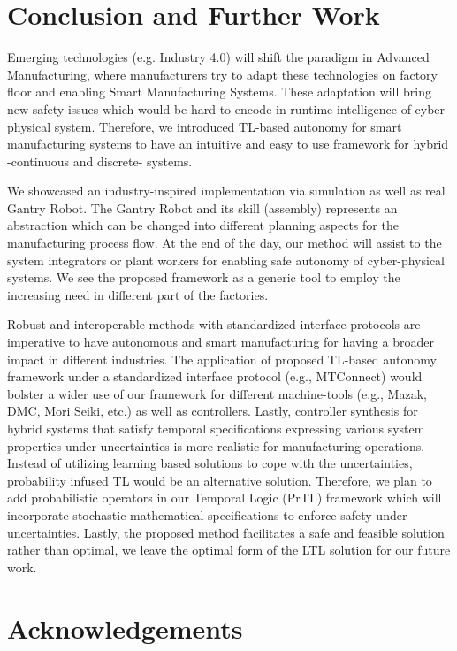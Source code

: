 \documentclass[3p,twocolumn,times,procedia]{elsarticle}
\begin{document}
\section{Conclusion and Further Work}
Emerging technologies (e.g. Industry 4.0) will shift the paradigm in Advanced Manufacturing, where manufacturers try to adapt these technologies on factory floor and enabling Smart Manufacturing Systems. These adaptation will bring new safety issues which would be hard to encode in runtime intelligence of cyber-physical system. Therefore, we introduced TL-based autonomy for smart manufacturing systems to have an intuitive and easy to use framework for hybrid -continuous and discrete- systems.

We showcased an industry-inspired implementation via simulation as well as real Gantry Robot. The Gantry Robot and its skill (assembly) represents an abstraction which can be changed into different planning aspects for the manufacturing process flow. At the end of the day, our method will assist to the system integrators or plant workers for enabling safe autonomy of cyber-physical systems. We see the proposed framework as a generic tool to employ the increasing need in different part of the factories.

Robust and interoperable methods with standardized interface protocols are imperative to have autonomous and smart manufacturing for having a broader impact in different industries. The application of proposed TL-based autonomy framework under a standardized interface protocol (e.g., MTConnect) would bolster a wider use of our framework for different machine-tools (e.g., Mazak, DMC, Mori Seiki, etc.) as well as controllers. Lastly, controller synthesis for hybrid systems that satisfy temporal specifications expressing various system properties under uncertainties is more realistic for manufacturing operations. Instead of utilizing learning based solutions to cope with the uncertainties, probability infused TL would be an alternative solution. Therefore, we plan to add probabilistic operators in our Temporal Logic (PrTL) framework which will incorporate stochastic mathematical specifications to enforce safety under uncertainties. Lastly, the proposed method facilitates a safe and feasible solution rather than optimal, we leave the optimal form of the LTL solution for our future work.

\section*{Acknowledgements}
\end{document}
